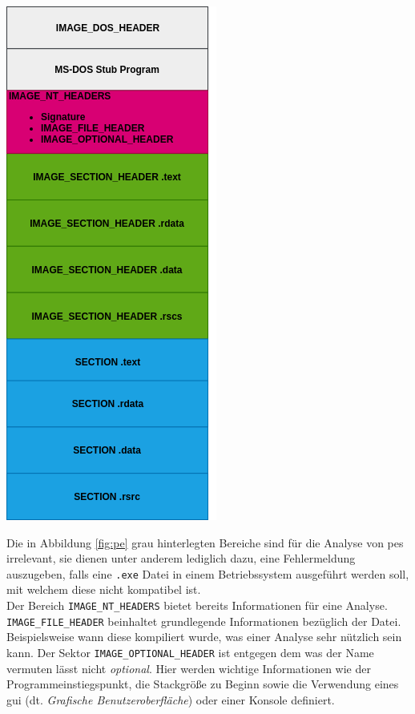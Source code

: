 \documentclass[
    12pt, %
    DIV10,
    ngerman, %
    a4paper, %
    oneside, %
    titlepage, %
    parskip=half, %
    headings=normal, %
    listof=totoc, %
    bibliography=totoc, %
    index=totoc, %
    captions=tableheading, %
    final %
]{scrreprt}
\begin{document}
\begin{center}
\includegraphics[scale=0.5]{img/pe.png}
\label{fig:pe}
\end{center}
Die in Abbildung \ref{fig:pe} grau hinterlegten Bereiche sind für die Analyse von \ac{pes} irrelevant, sie dienen unter anderem lediglich dazu, eine Fehlermeldung auszugeben, falls eine \texttt{.exe} Datei in einem Betriebssystem ausgeführt werden soll, mit welchem diese nicht kompatibel ist.\\
Der Bereich \texttt{IMAGE\_NT\_HEADERS} bietet bereits Informationen für eine Analyse. \texttt{IMAGE\_FILE\_HEADER} beinhaltet grundlegende Informationen bezüglich der Datei. Beispielsweise wann diese kompiliert wurde, was einer Analyse sehr nützlich sein kann. Der Sektor \texttt{IMAGE\_OPTIONAL\_HEADER} ist entgegen dem was der Name vermuten lässt nicht \emph{optional}. Hier werden wichtige Informationen wie der Programmeinstiegspunkt, die Stackgröße zu Beginn sowie die Verwendung eines \ac{gui} (dt. \emph{Grafische Benutzeroberfläche}) oder einer Konsole definiert.\\
\end{document}
